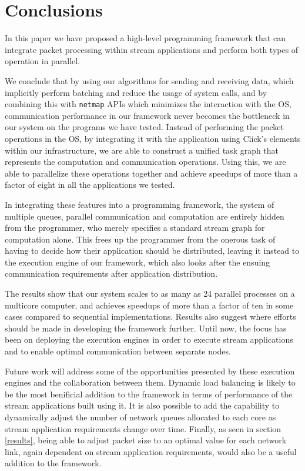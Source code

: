 \documentclass[conference]{IEEEtran}
\begin{document}
\section{Conclusions}
In this paper we have proposed a high-level programming framework that can integrate packet processing within stream applications and perform both types of operation in parallel.

We conclude that by using our algorithms for sending and receiving data, which implicitly perform batching and reduce the usage of system calls, and by combining this with \texttt{netmap} APIs which minimizes the interaction with the OS, communication performance in our framework never becomes the bottleneck in our system on the programs we have tested. Instead of performing the packet operations in the OS, by integrating it with the application using Click's elements within our infrastructure, we are able to construct a unified task graph that represents the computation and communication operations. Using this, we are able to parallelize these operations together and achieve speedups of more than a factor of eight in all the applications we tested.

In integrating these features into a programming framework, the system of multiple queues, parallel communication and computation are entirely hidden from the programmer, who merely specifies a standard stream graph for computation alone. This frees up the programmer from the onerous task of having to decide how their application should be distributed, leaving it instead to the execution engine of our framework, which also looks after the ensuing communication requirements after application distribution.

The results show that our system scales to as many as 24 parallel processes on a multicore computer, and achieves speedups of more than a factor of ten in some cases compared to sequential implementations. Results also suggest where efforts should be made in developing the framework further. Until now, the focus has been on deploying the execution engines in order to execute stream applications and to enable optimal communication between separate nodes.

Future work will address some of the opportunities presented by these execution engines and the collaboration between them. Dynamic load balancing is likely to be the most benificial addition to the framework in terms of performance of the stream applications built using it. It is also possible to add the capability to dynamically adjust the number of network queues allocated to each core as stream application requirements change over time. Finally, as seen in section \ref {results}, being able to adjust packet size to an optimal value for each network link, again dependent on stream application requirements, would also be a useful addition to the framework.
\end{document}
